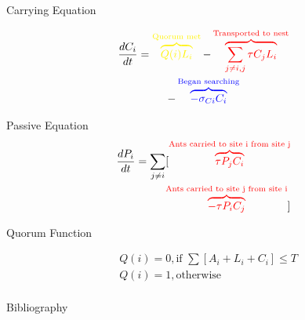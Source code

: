 \documentclass{beamer}
\makeatletter
\def\mcolor#1#{\@mcolor{#1}}
\def\@mcolor#1#2#3{%
  \protect\leavevmode
  \begingroup
    \color#1{#2}#3%
  \endgroup
}
\newcommand{\annotate}[3]{
\mcolor{#1}{\overbrace{#3}^\text{#2}}
}
\makeatother
\begin{document}
\begin{frame}{Carrying Equation}

\begin{multline}
    \frac{dC_i}{dt} = \annotate{yellow}{Quorum met}{Q(i)L_i} - \annotate{red}{Transported to nest}{\sum_{j \neq i, j} \tau C_jL_i} \\
    - \annotate{blue}{Began searching}{- \sigma_{Ci}C_i}
\end{multline}


\end{frame}

\begin{frame}{Passive Equation}
\begin{equation}
\begin{aligned}
    \frac{dP_i}{dt} = \sum_{j \neq i} [\annotate{red}{Ants carried to site i from site j}{\tau P_j C_i} \\ \annotate{red}{Ants carried to site j from site i}{- \tau P_i C_j}]
\end{aligned}
\end{equation}

\end{frame}

\begin{frame}{Quorum Function}


\begin{equation}
\begin{aligned}
  & Q(i) = 0, \text{if    } \sum [A_i + L_i + C_i] \leq T \\
  & Q(i) = 1, \text{otherwise} \\
\end{aligned}
\end{equation}
\end{frame}

  \begin{frame}{Bibliography}
      
  \end{frame}
\end{document}
